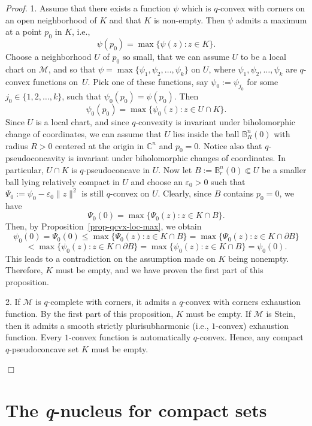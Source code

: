 \documentclass[11pt,a4paper]{article}
\newenvironment{proof}{\noindent\textit{Proof. }}{\hfill $\Box$\linebreak}
\newcommand{\BB}{\mathbb{B}}
\newcommand{\CC}{\mathbb{C}}
\newcommand{\Mcal}{\mathcal{M}}
\newcommand{\eps}{\varepsilon}
\begin{document}
\begin{proof} 1. Assume that there exists a function $\psi$ which is $q$-convex with corners on an open neighborhood of $K$ and that $K$ is non-empty. Then $\psi$ admits a maximum at a point $p_0$ in $K$, i.e.,
\[
\psi(p_0) = \max\{\psi(z) : z \in K\}.
\]
Choose a neighborhood $U$ of $p_0$ so small, that we can assume $U$ to be a local chart on $\Mcal$, and so that $\psi=\max\{\psi_1,\psi_2,\ldots,\psi_k\}$ on $U$, where $\psi_1,\psi_2,\ldots,\psi_k$ are $q$-convex functions on~$U$. Pick one of these functions, say $\psi_0:=\psi_{j_0}$ for some $j_0\in\{1,2,\ldots,k\}$, such that $\psi_{0}(p_0)=\psi(p_0)$. Then
\[
\psi_{0}(p_0) = \max\{\psi_{0}(z) : z \in U \cap K\}.
\]
Since $U$ is a local chart, and since $q$-convexity is invariant under biholomorphic change of coordinates, we can assume that $U$ lies inside the ball $\BB_R^n(0)$ with radius $R>0$ centered at the origin in $\CC^n$ and $p_0=0$. Notice also that $q$-pseudoconcavity is invariant under biholomorphic changes of coordinates. In particular, $U \cap K$ is $q$-pseudoconcave in $U$. Now let $B:=\BB_r^n(0) \Subset U$ be a smaller ball lying relatively compact in $U$ and choose an $\varepsilon_0>0$ such that $\Psi_0:=\psi_0-\eps_0\|z\|^2$ is still $q$-convex on $U$. Clearly, since $B$ contains $p_0=0$, we have
\[
\Psi_0(0)=\max\{\Psi_0(z) : z \in K \cap B\}.
\]
Then, by Proposition~\ref{prop-qcvx-loc-max}, we obtain
\[
\psi_0(0)=\Psi_0(0)\leq\max\{\Psi_0(z) : z \in K \cap B\} = \max\{\Psi_0(z) : z \in K \cap \partial B\}
\]
\[
 < \max\{\psi_0(z) : z \in K \cap \partial B\} = \max\{\psi_0(z) : z \in K \cap B\} = \psi_0(0).
\]
This leads to a contradiction on the assumption made on $K$ being nonempty. Therefore, $K$ must be empty, and we have proven the first part of this proposition.

\medskip

2. If $\Mcal$ is $q$-complete with corners, it admits a $q$-convex with corners exhaustion function. By the first part of this proposition, $K$ must be empty. If $\Mcal$ is Stein, then it admits a smooth strictly plurisubharmonic (i.e., $1$-convex) exhaustion function. Every $1$-convex function is automatically $q$-convex. Hence, any compact $q$-pseudoconcave set $K$ must be empty.

\end{proof}



\section{The \textit{q}-nucleus for compact sets}\label{sec-q-nuc-compact}
\end{document}
